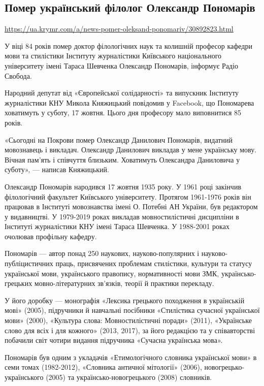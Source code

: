 
 

\subsection{Помер український філолог Олександр Пономарів}
\label{sec:14_10_2020.news.ua.krymr.1.ponomariv}

\url{https://ua.krymr.com/a/news-pomer-oleksand-ponomariv/30892823.html}

У віці 84 років помер доктор філологічних наук та колишній професор кафедри
мови та стилістики Інституту журналістики Київського національного університету
імені Тараса Шевченка Олександр Пономарів, інформує Радіо Свобода.

Народний депутат від «Європейської солідарності» та випускник Інституту
журналістики КНУ Микола Княжицький повідомив у Facebook, що Пономарева
ховатимуть у суботу, 17 жовтня. Цього дня професору мало виповнитися 85 років.

«Сьогодні на Покрови помер Олександр Данилович Пономарів, видатний мовознавець
і викладач. Олександр Данилович викладав у мене українську мову. Вічная пам'ять
і співчуття близьким. Ховатимуть Олександра Даниловича у суботу», --- написав
Княжицький.

Олександр Пономарів народився 17 жовтня 1935 року. У 1961 році закінчив
філологічний факультет Київського університету. Протягом 1961-1976 років він
працював в Інституті мовознавства імені О. Потебні АН України, був редактором у
видавництві. У 1979-2019 роках викладав мовностилістичні дисципліни в Інституті
журналістики КНУ імені Тараса Шевченка. У 1988-2001 роках очолював профільну
кафедру.

Пономарів --- автор понад 250 наукових, науково-популярних і
науково-публіцистичних праць, присвячених проблемам стилістики, культури та
статусу української мови, українського правопису, нормативності мови ЗМК,
українсько-грецьких мовно-літературних зв’язків, теорії й практики перекладу.

У його доробку --- монографія «Лексика грецького походження в українській мові»
(2005), підручники й навчальні посібники «Стилістика сучасної української мови»
(2000), «Культура слова: Мовностилістичні поради» (2011), «Українське слово для
всіх і для кожного» (2013, 2017), за його редакцією та у співавторстві побачили
світ чотири видання підручника «Сучасна українська мова».

Пономарів був одним з укладачів «Етимологічного словника української мови» в
семи томах (1982-2012), «Словника античної мітології» (2006),
новогрецько-українського (2005) та українсько-новогрецького (2008) словників.
